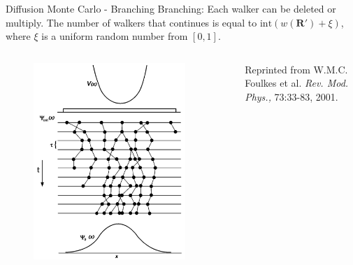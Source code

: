 \documentclass{beamer}
\newcommand{\R}{\mathbf{R}}
\begin{document}
\begin{frame}{Diffusion Monte Carlo - Branching}
Branching: Each walker can be deleted or multiply. The number of walkers that continues is equal to $\mathrm{int}\left(w(\R')+\xi\right)$, where $\xi$ is a uniform random number from $[0,1]$.
\begin{columns}
\begin{column}{0.4\textwidth}
\begin{figure}
   \includegraphics[width=0.9\textwidth]{../figures/branching.png}
\end{figure}
\end{column}
\begin{column}{0.7\textwidth}
   {\color{blue}{Figure:}} Reprinted from W.M.C. Foulkes et al. \textit{Rev. Mod. Phys.,} 73:33-83, 2001.
\end{column}
\end{columns}
\end{frame}
\end{document}
